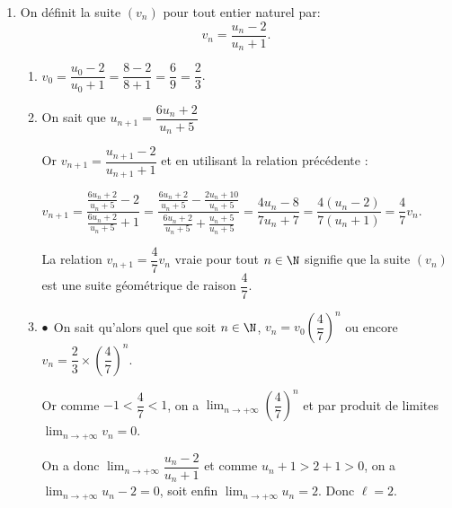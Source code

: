 \begin{enumerate}
	\begin{enumerate}
		\item %
		On a $u_n > 2 \implies u_n + 1 > 2 + 1 > 0$ et $u_n > 2 \implies u_n + 5 > 2 + 5 > 0$.
		
Le signe du quotient précédent est donc celui de $2 - u_n$ ; or $u_n > 2 \implies $

$0 > 2 - u_n$, donc $u_{n+1} - u_n < 0$ ce qui signifie que la suite $\left(u_n\right)$ est décroissante.
		\item %
La suite $\left(u_n\right)$ étant décroissante et minorée par 2 est donc convergente vers une limite $\ell$, avec $\ell \geqslant 2$.
	\end{enumerate}
\item On définit la suite $\left(v_n\right)$ pour tout entier naturel par:
\[v_n = \dfrac{u_n - 2}{u_n + 1}.\]

	\begin{enumerate}
		\item %
$v_0 = \dfrac{u_0 - 2}{u_0 + 1} = \dfrac{8 - 2}{8 + 1} = \dfrac{6}{9} = \dfrac{2}{3}$.
		\item %
On sait que $u_{n +1} = \dfrac{6u_n + 2}{u_n +5}$
		
Or $v_{n+1} = \dfrac{u_{n+1} - 2}{u_{n+1} + 1}$ et en utilisant la relation précédente :

$v_{n+1} =  \dfrac{\frac{6u_n + 2}{u_n + 5} - 2}{\frac{6u_n + 2}{u_n + 5} + 1} = \dfrac{\frac{6u_n + 2}{u_n + 5} - \frac{2u_n + 10}{u_n + 5}}{\frac{6u_n + 2}{u_n + 5} + \frac{u_n + 5}{u_n + 5}} =\dfrac{4u_n - 8}{7u_n + 7} = \dfrac{4\left(u_n - 2\right)}{7\left(u_n + 1\right)} = \dfrac47 v_n$.

La relation $v_{n+1} = \dfrac47v_n$ vraie pour tout $n \in \N$ signifie que la suite $\left(v_n\right)$ est une suite géométrique de raison $\dfrac47$.
		\item %
$\bullet~~$On sait qu'alors quel que soit $n \in \N$, \: $v_n = v_0\left(\dfrac47\right)^n$ ou encore $v_n = \dfrac{2}{3}\times \left(\dfrac47\right)^n$.

Or comme $- 1 < \dfrac{4}{7} < 1$, on a $\displaystyle\lim_{n \to + \infty} \left(\dfrac47\right)^n$ et par produit de limites $\displaystyle\lim_{n \to + \infty}v_n = 0$.

On a donc $\displaystyle\lim_{n \to + \infty} \dfrac{u_n - 2}{u_n + 1}$ et comme $u_n + 1 > 2 + 1 > 0$, on a $\displaystyle\lim_{n \to + \infty} u_n - 2 = 0$, soit enfin $\displaystyle\lim_{n \to + \infty} u_n = 2$. Donc $\ell = 2$.


\end{enumerate}
\end{enumerate}
